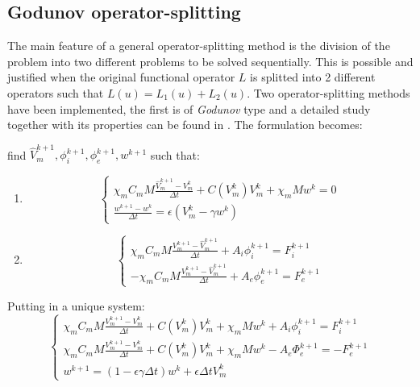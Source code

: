 \documentclass[a4paper,11pt]{article}
\begin{document}
\subsection{Godunov operator-splitting}
The main feature of a general operator-splitting method is the division of the problem into two different problems to be solved sequentially. This is possible and justified when the original functional operator $L$ is splitted into 2 different operators such that $L(u)=L_1(u)+L_2(u)$.
Two operator-splitting methods have been implemented, the first is of \emph{Godunov} type and a detailed study together with its properties can be found in \cite{spiteri}. The formulation becomes: \\
\begin{center}find $\hat{V}_m^{k+1},\phi_i^{k+1},\phi_e^{k+1},w^{k+1}$ such that:\end{center}
\begin{enumerate}[label = \Roman*]
\item
\begin{equation*}
\begin{cases}
\chi_m C_m M\frac{\hat{V}_m^{k+1} - V_m^k}{\Delta t} + C(V_m^k)V_m^k +\chi_mMw^k = 0\\
\frac{w^{k+1}-w^k}{\Delta t} = \epsilon (V_m^k - \gamma w^k)
\end{cases}
\end{equation*}
\item
\begin{equation*}
\begin{cases}
\chi_m C_m M\frac{V_m^{k+1} - \hat{V}_m^{k+1}}{\Delta t} + A_i\phi_i^{k+1} = F_i^{k+1} \\
-\chi_m C_m M\frac{V_m^{k+1} - \hat{V}_m^{k+1}}{\Delta t} + A_e\phi_e^{k+1} = F_e^{k+1}
\end{cases}
\end{equation*}
\end{enumerate}
\noindent Putting in a unique system:
\begin{equation}\label{Godunov}
\begin{cases}
\chi_m C_m M\frac{V_m^{k+1} - V_m^k}{\Delta t} + C(V_m^k)V_m^k +\chi_mMw^k + A_i \phi_i^{k+1}= F_i^{k+1} \\
\chi_m C_m M\frac{V_m^{k+1} - V_m^k}{\Delta t} + C(V_m^k)V_m^k +\chi_mMw^k - A_e \Phi_e^{k+1}= -F_e^{k+1} \\
w^{k+1} = (1-\epsilon \gamma \Delta t) w^k + \epsilon \Delta t V_m^k
\end{cases}
\end{equation}
\end{document}
